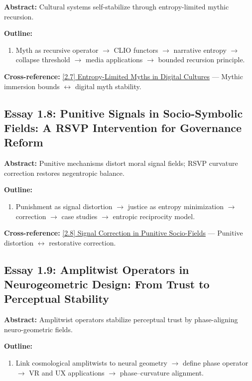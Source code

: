 \documentclass[12pt,a4paper]{article}
\begin{document}
\textbf{Abstract:} Cultural systems self-stabilize through entropy-limited mythic recursion.

\textbf{Outline:}
\begin{enumerate}
\item Myth as recursive operator $\to$ CLIO functors $\to$ narrative entropy  $\to$ collapse threshold $\to$ media applications $\to$ bounded recursion principle.
\end{enumerate}

\textbf{Cross-reference:} \hyperref[sec:essay2-7]{[2.7] Entropy-Limited Myths in Digital Cultures} --- Mythic immersion bounds $\leftrightarrow$ digital myth stability.

\subsection{Essay 1.8: Punitive Signals in Socio-Symbolic Fields: A RSVP Intervention for Governance Reform}
\label{sec:essay1-8}

\textbf{Abstract:} Punitive mechanisms distort moral signal fields; RSVP curvature correction restores negentropic balance.

\textbf{Outline:}
\begin{enumerate}
\item Punishment as signal distortion $\to$ justice as entropy minimization $\to$ correction  $\to$ case studies $\to$ entropic reciprocity model.
\end{enumerate}

\textbf{Cross-reference:} \hyperref[sec:essay2-8]{[2.8] Signal Correction in Punitive Socio-Fields} --- Punitive distortion $\leftrightarrow$ restorative correction.

\subsection{Essay 1.9: Amplitwist Operators in Neurogeometric Design: From Trust to Perceptual Stability}
\label{sec:essay1-9}

\textbf{Abstract:} Amplitwist operators stabilize perceptual trust by phase-aligning neuro-geometric fields.

\textbf{Outline:}
\begin{enumerate}
\item Link cosmological amplitwists to neural geometry $\to$ define phase operator  $\to$ VR and UX applications $\to$ phase--curvature alignment.
\end{enumerate}
\end{document}
